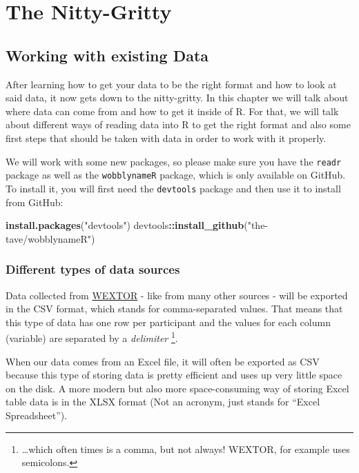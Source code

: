 \documentclass[
]{book}
\newenvironment{Shaded}{\begin{snugshade}}{\end{snugshade}}
\newcommand{\FunctionTok}[1]{\textcolor[rgb]{0.13,0.29,0.53}{\textbf{#1}}}
\newcommand{\NormalTok}[1]{#1}
\newcommand{\SpecialCharTok}[1]{\textcolor[rgb]{0.81,0.36,0.00}{\textbf{#1}}}
\newcommand{\StringTok}[1]{\textcolor[rgb]{0.31,0.60,0.02}{#1}}
\begin{document}
\part{The Nitty-Gritty}\label{part-the-nitty-gritty}

\chapter{Working with existing Data}\label{exdata}

After learning how to get your data to be the right format and how to look at said data, it now gets down to the nitty-gritty.
In this chapter we will talk about where data can come from and how to get it inside of R.
For that, we will talk about different ways of reading data into R to get the right format and also some first steps that should be taken with data in order to work with it properly.

We will work with some new packages, so please make sure you have the \texttt{readr} package as well as the \texttt{wobblynameR} package, which is only available on GitHub.
To install it, you will first need the \texttt{devtools} package and then use it to install from GitHub:

\begin{Shaded}
\begin{Highlighting}[]
\FunctionTok{install.packages}\NormalTok{(}\StringTok{"devtools"}\NormalTok{)}
\NormalTok{devtools}\SpecialCharTok{::}\FunctionTok{install\_github}\NormalTok{(}\StringTok{"the{-}tave/wobblynameR"}\NormalTok{)}
\end{Highlighting}
\end{Shaded}

\section{Different types of data sources}\label{different-types-of-data-sources}

Data collected from \href{https://www.wextor.eu}{WEXTOR} - like from many other sources - will be exported in the CSV format, which stands for comma-separated values.
That means that this type of data has one row per participant and the values for each column (variable) are separated by a \emph{delimiter} \footnote{\ldots which often times is a comma, but not always! WEXTOR, for example uses semicolons.}.

When our data comes from an Excel file, it will often be exported as CSV because this type of storing data is pretty efficient and uses up very little space on the disk.
A more modern but also more space-consuming way of storing Excel table data is in the XLSX format (Not an acronym, just stands for ``Excel Spreadsheet'').
\end{document}
